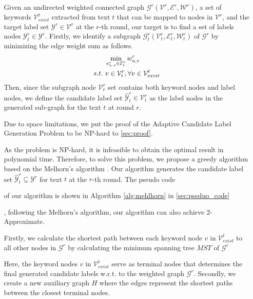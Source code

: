 \begin{definition}   
	Given an undirected weighted connected graph $\mathcal{G}^r(\mathcal{V}^r,\mathcal{E}^r,\mathcal{W}^r)$, a set of keywords $\mathcal{V}_{exist}^t$ extracted from text $t$ that can be mapped to nodes in $\mathcal{V}^r$, and the target label set $\mathcal{Y}^r\in \mathcal{V}^r$ at the $r$-th round, our target is to find a set of labels nodes ${\mathcal{Y}}^r_t \in {\mathcal{Y}}^r$. 
	Firstly, we identify a subgraph $\mathcal{G}^r_t(\mathcal{V}^r_t, \mathcal{E}^r_t, \mathcal{W}^r_t)$ of $\mathcal{G}^r$ by minimizing the edge weight sum as follows.
	\vspace{-10px}
	\begin{align}
	&	\min_{e^r_{u.v} \in \mathcal{E}^r_t}w^r_{u,v} \notag\\
			s.t. \  &v \in \mathcal{V}^r_t, \forall v \in \mathcal{V}_{exist}^t 
	\end{align}
Then, since the subgraph node  $\mathcal{V}^r_t$ set contains both keyword nodes and label nodes,
we define the candidate label set $\hat{\mathcal{Y}}^r_t \in \mathcal{V}^r_t$ as the label nodes in the generated sub-graph for the text $t$ at round $r$.
\end{definition}
\vspace{-5px}

 Due to space limitations, we put the proof of the Adaptive Candidate Label Generation Problem to be NP-hard to \autoref{sec:proof}. 

As the problem is NP-hard, it is infeasible to obtain the optimal result in polynomial time.
Therefore, 
to solve this problem, we propose a greedy algorithm based on the Melhorn's algorithm \cite{mehlhorn1988faster}. Our algorithm generates the candidate label set $\hat{\mathcal{Y}}^r_t \subseteq \mathcal{Y}^r$ for text $t$ at the $r$-th round.
The pseudo code 

of our algorithm is shown 
in Algorithm \autoref{alg:mehlhorn} in \autoref{sec:pseduo_code}

, following the Melhorn's algorithm, our algorithm can also achieve 2-Approximate.


Firstly, we calculate the shortest path between each keyword node $v$ in $\mathcal{V}_{exist}^t$ to all other nodes in $\mathcal{G}^r$ by calculating the minimum spanning tree $MST$ of $\mathcal{G}^r$ 

Here, the keyword nodes $v$ in $\mathcal{V}_{exist}^t$ serve as terminal nodes that determines the final generated candidate labels w.r.t. to the weighted graph $\mathcal{G}^r$.
Secondly, we create a new auxiliary graph $H$ where the edges represent the shortest paths between the closest terminal nodes. 

